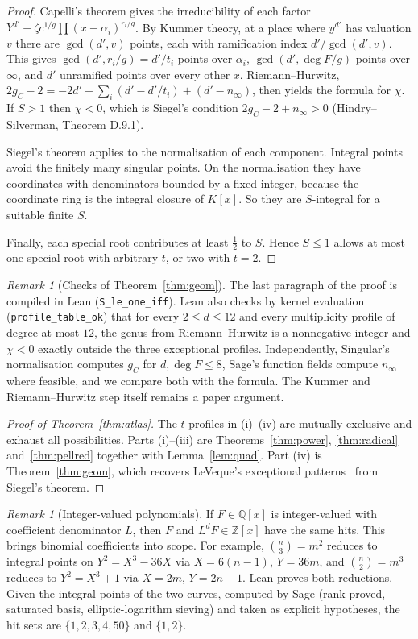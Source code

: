 \documentclass[11pt]{amsart}
\theoremstyle{definition}
\theoremstyle{remark}
\newtheorem{remark}[theorem]{Remark}
\newcommand{\Z}{\mathbb{Z}}
\newcommand{\Q}{\mathbb{Q}}
\newcommand{\lean}[1]{\texttt{#1}}
\begin{document}
\begin{proof}
Capelli's theorem gives the irreducibility of each factor $Y^{d'}-\zeta c^{1/g}\prod(x-\alpha_i)^{r_i/g}$. By Kummer theory, at a place where $y^{d'}$ has valuation $v$ there are $\gcd(d',v)$ points, each with ramification index $d'/\gcd(d',v)$. This gives $\gcd(d',r_i/g)=d'/t_i$ points over $\alpha_i$, $\gcd(d',\deg F/g)$ points over $\infty$, and $d'$ unramified points over every other $x$. Riemann--Hurwitz, $2g_C-2=-2d'+\sum_i(d'-d'/t_i)+(d'-n_\infty)$, then yields the formula for $\chi$. If $S>1$ then $\chi<0$, which is Siegel's condition $2g_C-2+n_\infty>0$ (Hindry--Silverman, Theorem D.9.1).

Siegel's theorem applies to the normalisation of each component. Integral points avoid the finitely many singular points. On the normalisation they have coordinates with denominators bounded by a fixed integer, because the coordinate ring is the integral closure of $K[x]$. So they are $S$-integral for a suitable finite $S$.

Finally, each special root contributes at least $\frac12$ to $S$. Hence $S\le1$ allows at most one special root with arbitrary $t$, or two with $t=2$.
\end{proof}

\begin{remark}[Checks of Theorem~\ref{thm:geom}]
The last paragraph of the proof is compiled in Lean (\lean{S\_le\_one\_iff}). Lean also checks by kernel evaluation (\lean{profile\_table\_ok}) that for every $2\le d\le12$ and every multiplicity profile of degree at most $12$, the genus from Riemann--Hurwitz is a nonnegative integer and $\chi<0$ exactly outside the three exceptional profiles. Independently, Singular's normalisation computes $g_C$ for $d,\deg F\le8$, Sage's function fields compute $n_\infty$ where feasible, and we compare both with the formula. The Kummer and Riemann--Hurwitz step itself remains a paper argument.
\end{remark}

\begin{proof}[Proof of Theorem~\ref{thm:atlas}]
The $t$-profiles in (i)--(iv) are mutually exclusive and exhaust all possibilities. Parts (i)--(iii) are Theorems~\ref{thm:power}, \ref{thm:radical} and~\ref{thm:pellred} together with Lemma~\ref{lem:quad}. Part (iv) is Theorem~\ref{thm:geom}, which recovers LeVeque's exceptional patterns~\cite{LeVeque} from Siegel's theorem.
\end{proof}

\begin{remark}[Integer-valued polynomials]\label{rem:intval}
If $F\in\Q[x]$ is integer-valued with coefficient denominator $L$, then $F$ and $L^dF\in\Z[x]$ have the same hits. This brings binomial coefficients into scope. For example, $\binom n3=m^2$ reduces to integral points on $Y^2=X^3-36X$ via $X=6(n-1)$, $Y=36m$, and $\binom n2=m^3$ reduces to $Y^2=X^3+1$ via $X=2m$, $Y=2n-1$. Lean proves both reductions. Given the integral points of the two curves, computed by Sage (rank proved, saturated basis, elliptic-logarithm sieving) and taken as explicit hypotheses, the hit sets are $\{1,2,3,4,50\}$ and $\{1,2\}$.
\end{remark}
\end{document}
